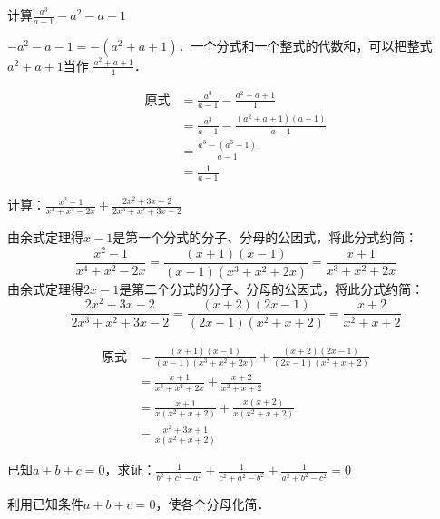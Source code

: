 \begin{example}
    计算$\frac{a^3}{a-1}-a^2-a-1$
\end{example}

\begin{analyze}
    $-a^2-a-1=-(a^2+a+1)$．一个分式和一个整式的代数和，可以把整式$a^2+a+1$当作
    $\frac{a^2+a+1}{1}$．
\end{analyze}

\begin{solution}
    \[\begin{split}
        \text{原式}&=\frac{a^3}{a-1}-\frac{a^2+a+1}{1}   \\
        &=  \frac{a^3}{a-1}-\frac{(a^2+a+1)(a-1)}{a-1}           \\
        &=\frac{a^3-(a^3-1)}{a-1}\\
        &=\frac{1}{a-1}
    \end{split}\]
\end{solution}


\begin{example}
计算：$\frac{x^2-1}{x^4+x^2-2x}+\frac{2x^2+3x-2}{2x^3+x^2+3x-2}$
\end{example}

\begin{analyze}
由余式定理得$x-1$是第一个分式的分子、分母的公因式，将此分式约简：
\[\frac{x^2-1}{x^4+x^2-2x}=\frac{(x+1)(x-1)}{(x-1)(x^3+x^2+2x)}=\frac{x+1}{x^3+x^2+2x}\]
由余式定理得$2x-1$是第二个分式的分子、分母的公因式，将此分式约简：
\[\frac{2x^2+3x-2}{2x^3+x^2+3x-2}=\frac{(x+2)(2x-1)}{(2x-1)(x^2+x+2)}=\frac{x+2}{x^2+x+2}\]
\end{analyze}

\begin{solution}
\[\begin{split}
    \text{原式}&=\frac{(x+1)(x-1)}{(x-1)(x^3+x^2+2x)}+\frac{(x+2)(2x-1)}{(2x-1)(x^2+x+2)}\\
    &=\frac{x+1}{x^3+x^2+2x}+ \frac{x+2}{x^2+x+2}  \\
    &= \frac{x+1}{x(x^2+x+2)}+ \frac{x(x+2)}{x(x^2+x+2)}   \\
    &=\frac{x^2+3x+1}{x(x^2+x+2)}
\end{split}\] 
\end{solution}

\begin{example}
    已知$a+b+c=0$，求证：$\frac{1}{b^2+c^2-a^2}+\frac{1}{c^2+a^2-b^2}+\frac{1}{a^2+b^2-c^2}=0$
\end{example}

\begin{analyze}
利用已知条件$a+b+c=0$，使各个分母化简．
\end{analyze}

